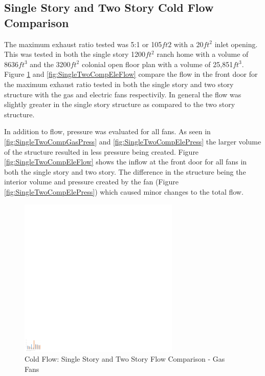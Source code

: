 \documentclass{article}
\begin{document}
\subsection{Single Story and Two Story Cold Flow Comparison}

The maximum exhaust ratio tested was 5:1 or 105$ft2$ with a 20$ft^2$ inlet opening. This was tested in both the single story 1200$ft^2$ ranch home with a volume of 8636$ft^3$ and the 3200$ft^2$ colonial open floor plan with a volume of 25,851$ft^3$. Figure \ref{fig:SingleTwoCompGasFlow} and \ref{fig:SingleTwoCompEleFlow} compare the flow in the front door for the maximum exhaust ratio tested in both the single story and two story structure with the gas and electric fans respectivily. In general the flow was slightly greater in the single story structure as compared to the two story structure. 

In addition to flow, pressure was evaluated for all fans. As seen in \ref{fig:SingleTwoCompGasPress} and \ref{fig:SingleTwoCompElePress} the larger volume of the structure resulted in less pressure being created. Figure \ref{fig:SingleTwoCompEleFlow} shows the inflow at the front door for all fans in both the single story and two story. The difference in the structure being the interior volume and pressure created by the fan (Figure \ref{fig:SingleTwoCompElePress}) which caused minor changes to the total flow. 

\begin{figure}[H]
	\centering
	\includegraphics[width=3in]{0_Images/ColdFlow/Gas_Flow.pdf}
	\caption{Cold Flow: Single Story and Two Story Flow Comparison - Gas Fans}
	\label{fig:SingleTwoCompGasFlow}
\end{figure}
\end{document}
